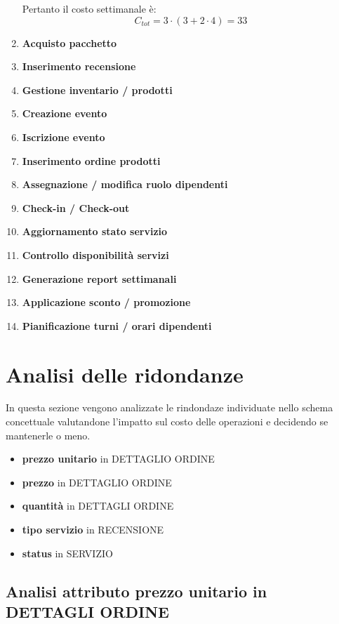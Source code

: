 \documentclass[a4paper,12pt]{report}
\begin{document}
\begin{enumerate}
  	Pertanto il costo settimanale è:
    $$
    C_{tot} = 3 \cdot (3 + 2 \cdot 4) = 33
    $$
	\item \textbf{Acquisto pacchetto} \label{op6}
	\item \textbf{Inserimento recensione} \label{op7}
	\item \textbf{Gestione inventario / prodotti} \label{op8}
	\item \textbf{Creazione evento} \label{op9}
	\item \textbf{Iscrizione evento} \label{op10}
	\item \textbf{Inserimento ordine prodotti} \label{op11}
	\item \textbf{Assegnazione / modifica ruolo dipendenti} \label{op12}
	\item \textbf{Check-in / Check-out} \label{op13}
	\item \textbf{Aggiornamento stato servizio} \label{op14}
	\item \textbf{Controllo disponibilità servizi} \label{op15}
	\item \textbf{Generazione report settimanali} \label{op16}
	\item \textbf{Applicazione sconto / promozione} \label{op17}
	\item \textbf{Pianificazione turni / orari dipendenti} \label{op18}
\end{enumerate}

\section{Analisi delle ridondanze}
In questa sezione vengono analizzate le rindondaze individuate nello schema concettuale valutandone l'impatto sul
costo delle operazioni e decidendo se mantenerle o meno.

\begin{itemize}
	\item \textbf{prezzo unitario} in DETTAGLIO ORDINE
	\item \textbf{prezzo} in DETTAGLIO ORDINE
	\item \textbf{quantità} in DETTAGLI ORDINE
	\item \textbf{tipo servizio} in RECENSIONE
	\item \textbf{status} in SERVIZIO
\end{itemize}

\subsection{Analisi attributo prezzo unitario in DETTAGLI ORDINE}
\end{document}
